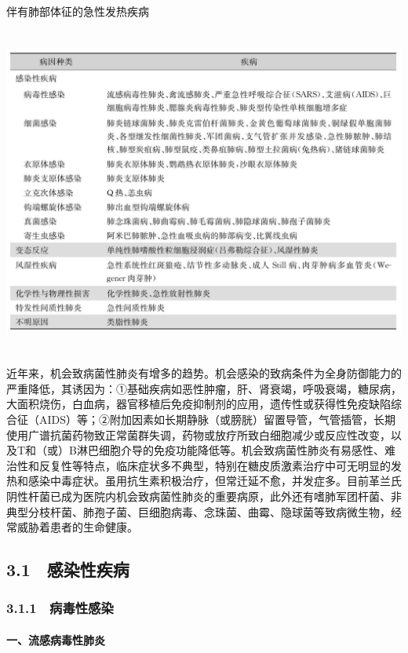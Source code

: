 \begin{table}[htbp]
\centering
\caption{伴有肺部体征的急性发热疾病}
\label{tab2-8}
\includegraphics[width=5.95833in,height=4.26042in]{./images/Image00012.jpg}
\end{table}

近年来，机会致病菌性肺炎有增多的趋势。机会感染的致病条件为全身防御能力的严重降低，其诱因为：①基础疾病如恶性肿瘤，肝、肾衰竭，呼吸衰竭，糖尿病，大面积烧伤，白血病，器官移植后免疫抑制剂的应用，遗传性或获得性免疫缺陷综合征（AIDS）等；②附加因素如长期静脉（或膀胱）留置导管，气管插管，长期使用广谱抗菌药物致正常菌群失调，药物或放疗所致白细胞减少或反应性改变，以及T和（或）B淋巴细胞介导的免疫功能降低等。机会致病菌性肺炎有易感性、难治性和反复性等特点，临床症状多不典型，特别在糖皮质激素治疗中可无明显的发热和感染中毒症状。虽用抗生素积极治疗，但常迁延不愈，并发症多。目前革兰氏阴性杆菌已成为医院内机会致病菌性肺炎的重要病原，此外还有嗜肺军团杆菌、非典型分枝杆菌、肺孢子菌、巨细胞病毒、念珠菌、曲霉、隐球菌等致病微生物，经常威胁着患者的生命健康。

\subsection{3.1　感染性疾病}

\subsubsection{3.1.1　病毒性感染}

\paragraph{一、流感病毒性肺炎}

